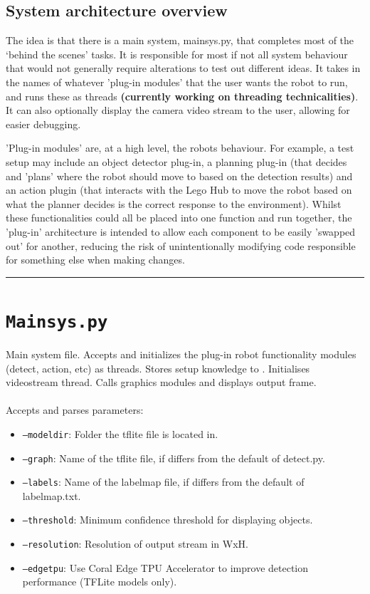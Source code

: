 \documentclass[10pt]{article}
\newcommand{\divider}{\vskip2pt\hrule\vskip2pt}
\begin{document}
\subsection*{System architecture overview}

The idea is that there is a main system, mainsys.py, that completes most of the `behind the scenes' tasks. It is responsible for most if not all system behaviour that would not generally require alterations to test out different ideas. It takes in the names of whatever 'plug-in modules' that the user wants the robot to run, and runs these as threads \textbf{(currently working on threading technicalities)}. It can also optionally display the camera video stream to the user, allowing for easier debugging.

'Plug-in modules' are, at a high level, the robots behaviour. For example, a test setup may include an object detector plug-in, a planning plug-in (that decides and 'plans' where the robot should move to based on the detection results) and an action plugin (that interacts with the Lego Hub to move the robot based on what the planner decides is the correct response to the environment). Whilst these functionalities could all be placed into one function and run together, the 'plug-in' architecture is intended to allow each component to be easily 'swapped out' for another, reducing the risk of unintentionally modifying code responsible for something else when making changes.
\\

\divider

\section*{\texttt{Mainsys.py}}
\label{sec:Mainsys.py}
Main system file. Accepts and initializes the plug-in robot functionality modules (detect, action, etc) as threads. Stores setup knowledge to . Initialises videostream thread. Calls graphics modules and displays output frame.
\\
\\
Accepts and parses parameters:
\begin{itemize}
    \item \texttt{--modeldir}: Folder the tflite file is located in.
    \item \texttt{--graph}: Name of the tflite file, if differs from the default of detect.py.
    \item \texttt{--labels}: Name of the labelmap file, if differs from the default of labelmap.txt.
    \item \texttt{--threshold}: Minimum confidence threshold for displaying objects.
    \item \texttt{--resolution}: Resolution of output stream in WxH.
    \item \texttt{--edgetpu}: Use Coral Edge TPU Accelerator to improve detection performance (TFLite models only).
\end{itemize}
\end{document}
